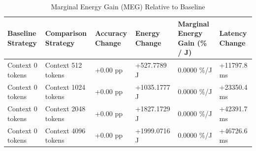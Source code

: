 \begin{table}
\caption{Marginal Energy Gain (MEG) Relative to Baseline}
\label{tab:marginal_energy_gain}
\begin{tabular}{llllll}
\toprule
Baseline Strategy & Comparison Strategy & Accuracy Change & Energy Change & Marginal Energy Gain (\% / J) & Latency Change \\
\midrule
Context 0 tokens & Context 512 tokens & +0.00 pp & +527.7789 J & 0.0000 \%/J & +11797.8 ms \\
Context 0 tokens & Context 1024 tokens & +0.00 pp & +1035.1777 J & 0.0000 \%/J & +23350.4 ms \\
Context 0 tokens & Context 2048 tokens & +0.00 pp & +1827.1729 J & 0.0000 \%/J & +42391.7 ms \\
Context 0 tokens & Context 4096 tokens & +0.00 pp & +1999.0716 J & 0.0000 \%/J & +46726.6 ms \\
\bottomrule
\end{tabular}
\end{table}
